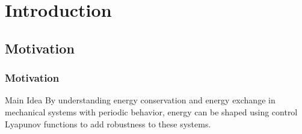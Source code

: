 \section{Introduction}
\showtoc

\subsection{Motivation}

\begin{frame}
  \frametitle{Motivation}
  \begin{block}{Main Idea}
    By understanding energy conservation and energy exchange in mechanical systems with periodic behavior, energy can be shaped using control Lyapunov functions to add robustness to these systems.
  \end{block}
\end{frame}


